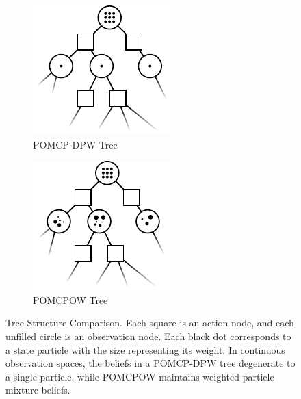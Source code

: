 \begin{figure}[htpb]
    \centering
    \begin{subfigure}[b]{0.45\columnwidth}
        \centering
        \includegraphics[width=\textwidth]{media/dpw_tree.pdf}
        \caption{POMCP-DPW Tree}
    \end{subfigure}
    \begin{subfigure}[b]{0.45\columnwidth}
        \centering
        \includegraphics[width=\textwidth]{media/pomcpow_tree.pdf}
        \caption{POMCPOW Tree}
    \end{subfigure}
    \caption{Tree Structure Comparison. Each square is an action node, and each unfilled circle is an observation node. Each black dot corresponds to a state particle with the size representing its weight. In continuous observation spaces, the beliefs in a POMCP-DPW tree degenerate to a single particle, while POMCPOW maintains weighted particle mixture beliefs.}
    \label{fig:treecomp}
\end{figure}

